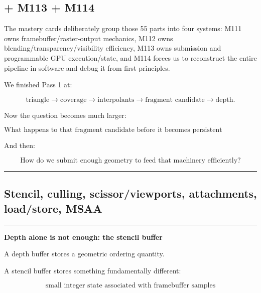 \subsection{+ M113 + M114}\label{03-visual-computing-i-ch013-m113-m114}

\hypertarget{03-visual-computing-i-ch013-m113-m114}{}

The mastery cards deliberately group those 55 parts into four systems: M111 owns framebuffer/raster-output mechanics, M112 owns blending/transparency/visibility efficiency, M113 owns submission and programmable GPU execution/state, and M114 forces us to reconstruct the entire pipeline in software and debug it from first principles.

We finished Pass 1 at:

\[
\text{triangle}
\rightarrow
\text{coverage}
\rightarrow
\text{interpolants}
\rightarrow
\text{fragment candidate}
\rightarrow
\text{depth}.
\]

Now the question becomes much larger:

\[
\boxed{
\text{What happens to that fragment candidate before it becomes persistent framebuffer state?}
}
\]

And then:

\[
\boxed{
\text{How do we submit enough geometry to feed that machinery efficiently?}
}
\]

\begin{center}\rule{0.5\linewidth}{0.5pt}\end{center}

\subsection{Stencil, culling, scissor/viewports, attachments, load/store, MSAA}\label{03-visual-computing-i-ch013-stencil-culling-scissorviewports-attachments-loadstore-msaa}

\hypertarget{03-visual-computing-i-ch013-stencil-culling-scissorviewports-attachments-loadstore-msaa}{}

\begin{center}\rule{0.5\linewidth}{0.5pt}\end{center}

\textbf{Depth alone is not enough: the stencil buffer}

A depth buffer stores a geometric ordering quantity.

A stencil buffer stores something fundamentally different:

\[
\boxed{\text{small integer state associated with framebuffer samples}}
\]

